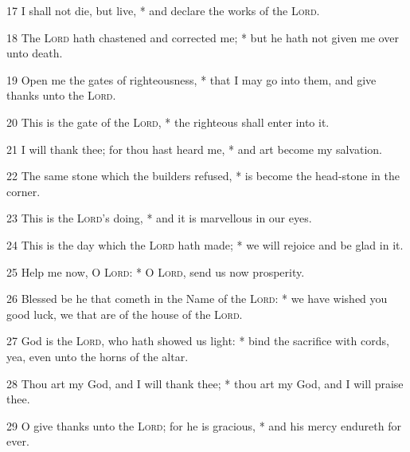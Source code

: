17 I shall not die, but live, * and declare the works of the {\textsc{Lord}}.\par
18 The {\textsc{Lord}} hath chastened and corrected me; * but he hath not given me over unto death.\par
19 Open me the gates of righteousness, * that I may go into them, and give thanks unto the {\textsc{Lord}}.\par
20 This is the gate of the {\textsc{Lord}}, * the righteous shall enter into it.\par
21 I will thank thee; for thou hast heard me, * and art become my salvation.\par
22 The same stone which the builders refused, * is become the head-stone in the corner.\par
23 This is the {\textsc{Lord}}'s doing, * and it is marvellous in our eyes.\par
24 This is the day which the {\textsc{Lord}} hath made; * we will rejoice and be glad in it.\par
25 Help me now, O {\textsc{Lord}}: * O {\textsc{Lord}}, send us now prosperity.\par
26 Blessed be he that cometh in the Name of the {\textsc{Lord}}: * we have wished you good luck, we that are of the house of the {\textsc{Lord}}.\par
27 God is the {\textsc{Lord}}, who hath showed us light: * bind the sacrifice with cords, yea, even unto the horns of the altar.\par
28 Thou art my God, and I will thank thee; * thou art my God, and I will praise thee.\par
29 O give thanks unto the {\textsc{Lord}}; for he is gracious, * and his mercy endureth for ever.
